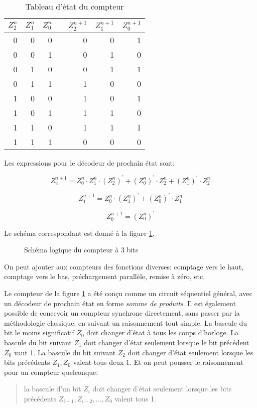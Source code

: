 \documentclass[11pt]{article}
\begin{document}
\begin{table}[htbp]
\caption{\label{tab:org847aec0}Tableau d'état du compteur}
\centering
\begin{tabular}{rrrlrrr}
\(Z_2^n\) & \(Z_1^n\) & \(Z_0^n\) &  & \(Z_2^{n+1}\) & \(Z_1^{n+1}\) & \(Z_0^{n+1}\)\\[0pt]
\hline
0 & 0 & 0 &  & 0 & 0 & 1\\[0pt]
0 & 0 & 1 &  & 0 & 1 & 0\\[0pt]
0 & 1 & 0 &  & 0 & 1 & 1\\[0pt]
0 & 1 & 1 &  & 1 & 0 & 0\\[0pt]
1 & 0 & 0 &  & 1 & 0 & 1\\[0pt]
1 & 0 & 1 &  & 1 & 1 & 0\\[0pt]
1 & 1 & 0 &  & 1 & 1 & 1\\[0pt]
1 & 1 & 1 &  & 0 & 0 & 0\\[0pt]
\end{tabular}
\end{table}

Les expressions pour le décodeur de prochain état sont: 

$$  Z_2^{n+1} = Z_0^n \cdot Z_1^n \cdot (Z_2^{n})^\prime + (Z_0^{n})^\prime \cdot Z_2^n + (Z_1^{n})^\prime \cdot Z_2^n $$

$$  Z_1^{n+1} = Z_0^{n} \cdot (Z_1^{n})^\prime + (Z_0^{n})^\prime \cdot Z_1^n $$

$$  Z_0^{n+1} = (Z_0^{n})^\prime $$


Le schéma correspondant est donné à la figure \ref{fig:org9c18510}.

\begin{figure}[htbp]
\centering

\caption{\label{fig:org9c18510}Schéma logique du compteur à 3 bits}
\end{figure}

On peut ajouter aux compteurs des fonctions diverses: comptage vers le
haut, comptage vers le bas, préchargement parallèle, remise à zéro,
etc.

Le compteur de la figure \ref{fig:org9c18510} a été conçu comme un circuit
séquentiel général, avec un décodeur de prochain état en forme \emph{somme
de produits}. Il est également possible de concevoir un compteur
synchrone directement, sans passer par la méthodologie classique, en
suivant un raisonnement tout simple. La bascule du bit le moins
significatif \(Z_0\) doit changer d'état à tous les coups
d'horloge. La bascule du bit suivant \(Z_1\) doit changer d'état
seulement lorsque le bit précédent \(Z_0\) vaut 1. La bascule du bit
suivant \(Z_2\) doit changer d'état seulement lorsque les bits
précédents \(Z_1, Z_0\) valent tous deux 1. Et on peut pousser le
raisonnement pour un compteur quelconque: 
\begin{quote}
la bascule d'un bit \(Z_i\)
doit changer d'état seulement lorsque les bits précédents
\(Z_{i-1},Z_{i-2},\ldots, Z_0\) valent tous 1.
\end{quote}
\end{document}

